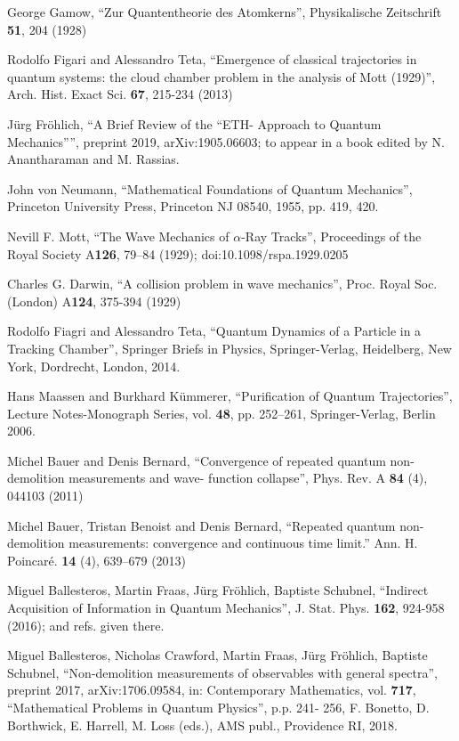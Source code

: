 \documentclass[12pt]{article}
\begin{document}
\begin{thebibliography}{99}

 George Gamow, ``Zur Quantentheorie des Atomkerns'', Physikalische Zeitschrift {\bf{51}}, 204 (1928)

 Rodolfo Figari and Alessandro Teta, ``Emergence of classical trajectories in quantum systems: the cloud chamber problem in the analysis of Mott (1929)'', Arch. Hist. Exact Sci. {\bf{67}}, 215-234 (2013)

 J\"urg Fr\"ohlich, ``A Brief Review of the ``ETH- Approach to Quantum Mechanics'''', preprint 2019,  	arXiv:1905.06603; to appear in a book edited by N. Anantharaman and M. Rassias.

 John von Neumann, ``Mathematical Foundations of Quantum Mechanics'', Princeton University Press, Princeton NJ 08540, 1955, pp. 419, 420.

 Nevill F. Mott, ``The Wave Mechanics of $\alpha$-Ray Tracks'', Proceedings of the Royal Society A{\bf{126}}, 79–84 (1929); doi:10.1098/rspa.1929.0205

 Charles G. Darwin, ``A collision problem in wave mechanics'', Proc. Royal Soc. (London) A{\bf{124}}, 375-394 (1929)

 Rodolfo Fiagri and Alessandro Teta, ``Quantum Dynamics of a Particle in a Tracking Chamber'', Springer Briefs in Physics, Springer-Verlag, Heidelberg, New York, Dordrecht, London, 2014.

 Hans Maassen and Burkhard K\"ummerer, ``Purification of Quantum Trajectories'', Lecture Notes-Monograph Series, vol. {\bf{48}}, pp. 252–261,  Springer-Verlag, Berlin 2006.

 Michel Bauer and Denis Bernard, ``Convergence of repeated quantum non-demolition measurements and wave-
function collapse'',  Phys. Rev. A {\bf{84}} (4), 044103 (2011)

 Michel Bauer, Tristan Benoist and Denis Bernard, ``Repeated quantum non-demolition measurements: convergence and continuous time limit.'' Ann. H. Poincaré. {\bf 14} (4), 639--679 (2013)

 Miguel Ballesteros, Martin Fraas, J\"urg Fr\"ohlich, Baptiste Schubnel, ``Indirect Acquisition of Information in Quantum Mechanics'', J. Stat. Phys. {\bf{162}}, 924-958 (2016); and refs. given there.

 Miguel Ballesteros, Nicholas Crawford, Martin Fraas, J\"urg Fr\"ohlich, Baptiste Schubnel, ``Non-demolition measurements of observables with general spectra'', preprint 2017, arXiv:1706.09584, in: Contemporary Mathematics, vol. {\bf{717}}, ``Mathematical Problems in Quantum Physics'', p.p. 241- 256, F. Bonetto, D. Borthwick, E. Harrell, M. Loss (eds.), AMS publ., Providence RI, 2018.


\end{thebibliography}
\end{document}
